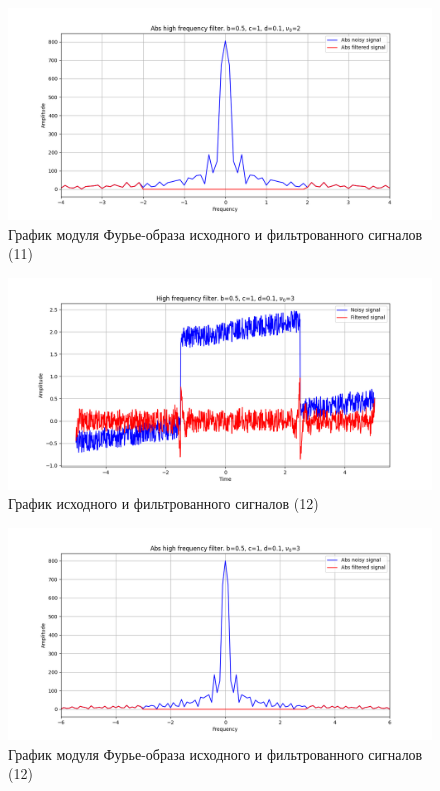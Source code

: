 \documentclass[a4paper, 12pt]{article}
\begin{document}
    \begin{figure}[!htb]
        \centering
        \includegraphics[scale=0.48]{11_abs_u_U_nolow.png}
        \captionsetup{skip=0pt}
        \caption{График модуля Фурье-образа исходного и фильтрованного сигналов (11)}
        \label{fig:fig48}
    \end{figure}
    \begin{figure}[!htb]
        \centering
        \includegraphics[scale=0.48]{12_u_flt_u_nolow.png}
        \captionsetup{skip=0pt}
        \caption{График исходного и фильтрованного сигналов (12)}
        \label{fig:fig49}
    \end{figure}
    \newpage
    \begin{figure}[!htb]
        \centering
        \includegraphics[scale=0.48]{12_abs_u_U_nolow.png}
        \captionsetup{skip=0pt}
        \caption{График модуля Фурье-образа исходного и фильтрованного сигналов (12)}
        \label{fig:fig50}
    \end{figure}
\end{document}
